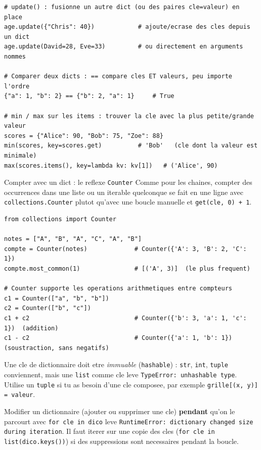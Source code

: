 \documentclass[11pt,a4paper]{article}
\begin{document}
\begin{lstlisting}
# update() : fusionne un autre dict (ou des paires cle=valeur) en place
age.update({"Chris": 40})            # ajoute/ecrase des cles depuis un dict
age.update(David=28, Eve=33)         # ou directement en arguments nommes

# Comparer deux dicts : == compare cles ET valeurs, peu importe l'ordre
{"a": 1, "b": 2} == {"b": 2, "a": 1}     # True

# min / max sur les items : trouver la cle avec la plus petite/grande valeur
scores = {"Alice": 90, "Bob": 75, "Zoe": 88}
min(scores, key=scores.get)          # 'Bob'   (cle dont la valeur est minimale)
max(scores.items(), key=lambda kv: kv[1])   # ('Alice', 90)
\end{lstlisting}

\begin{infobox}{Compter avec un dict : le reflexe \texttt{Counter}}
Comme pour les chaines, compter des occurrences dans une liste ou un
iterable quelconque se fait en une ligne avec \texttt{collections.Counter}
plutot qu'avec une boucle manuelle et \texttt{get(cle, 0) + 1}.
\begin{lstlisting}
from collections import Counter

notes = ["A", "B", "A", "C", "A", "B"]
compte = Counter(notes)             # Counter({'A': 3, 'B': 2, 'C': 1})
compte.most_common(1)               # [('A', 3)]  (le plus frequent)

# Counter supporte les operations arithmetiques entre compteurs
c1 = Counter(["a", "b", "b"])
c2 = Counter(["b", "c"])
c1 + c2                             # Counter({'b': 3, 'a': 1, 'c': 1})  (addition)
c1 - c2                             # Counter({'a': 1, 'b': 1})          (soustraction, sans negatifs)
\end{lstlisting}
\end{infobox}

\begin{piege}
Une cle de dictionnaire doit etre \emph{immuable} (\texttt{hashable}) : \texttt{str},
\texttt{int}, \texttt{tuple} conviennent, mais une \texttt{list} comme cle leve
\texttt{TypeError: unhashable type}. Utilise un \texttt{tuple} si tu as besoin
d'une cle composee, par exemple \texttt{grille[(x, y)] = valeur}.
\end{piege}

\begin{piege}
Modifier un dictionnaire (ajouter ou supprimer une cle) \textbf{pendant} qu'on
le parcourt avec \texttt{for cle in dico} leve \texttt{RuntimeError: dictionary
changed size during iteration}. Il faut iterer sur une copie des cles
(\texttt{for cle in list(dico.keys())}) si des suppressions sont necessaires
pendant la boucle.
\end{piege}
\end{document}
